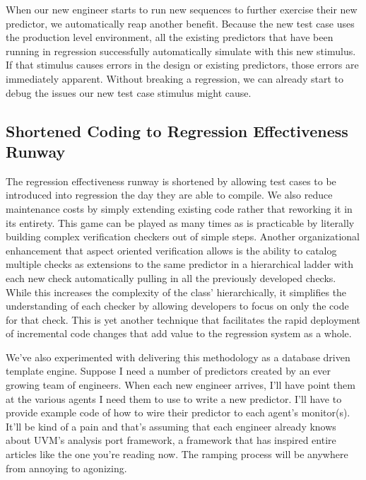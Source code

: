 \documentclass[twocolumn,letterpaper]{IEEEAerospaceCLS}  %
\begin{document}
When our new engineer starts to run new sequences to further exercise their new predictor, we automatically reap another benefit. Because the new test case uses the production level environment, all the existing predictors that have been running in regression successfully automatically simulate with this new stimulus. If that stimulus causes errors in the design or existing predictors, those errors are immediately apparent. Without breaking a regression, we can already start to debug the issues our new test case stimulus might cause. 

\subsection{Shortened Coding to Regression Effectiveness Runway}
The regression effectiveness runway is shortened by allowing test cases to be introduced into regression the day they are able to compile. We also reduce maintenance costs by simply extending existing code rather that reworking it in its entirety. This game can be played as many times as is practicable by literally building complex verification checkers out of simple steps. Another organizational enhancement that aspect oriented verification allows is the ability to catalog multiple checks as extensions to the same predictor in a hierarchical ladder with each new check automatically pulling in all the previously developed checks. While this increases the complexity of the class' hierarchically, it simplifies the understanding of each checker by allowing developers to focus on only the code for that check. This is yet another technique that facilitates the rapid deployment of incremental code changes that add value to the regression system as a whole.

We've also experimented with delivering this methodology as a database driven template engine. Suppose I need a number of predictors created by an ever growing team of engineers. When each new engineer arrives, I'll have point them at the various agents I need them to use to write a new predictor. I'll have to provide example code of how to wire their predictor to each agent's monitor(s). It'll be kind of a pain and that's assuming that each engineer already knows about UVM's analysis port framework, a framework that has inspired entire articles like the one you're reading now. The ramping process will be anywhere from annoying to agonizing.
\end{document}
